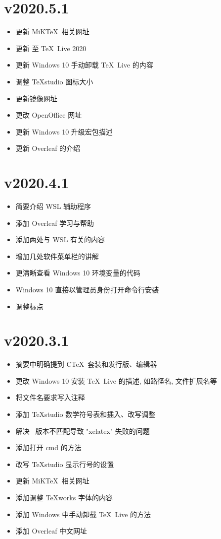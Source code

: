 \section*{v2020.5.1}

\begin{itemize}
  \item 更新 MiK\TeX\ 相关网址
  \item 更新 至 \TeX~Live 2020
  \item 更新 Windows 10 手动卸载 \TeX~Live 的内容
  \item 调整 \TeX studio 图标大小
  \item 更新镜像网址
  \item 更改 \textsf{OpenOffice} 网址
  \item 更新 Windows 10 升级宏包描述
  \item 更新 Overleaf 的介绍
\end{itemize}

\section*{v2020.4.1}

\begin{itemize}
  \item 简要介绍 WSL 辅助程序
  \item 添加 Overleaf 学习与帮助
  \item 添加两处与 WSL 有关的内容
  \item 增加几处软件菜单栏的讲解
  \item 更清晰查看 Windows 10 环境变量的代码
  \item Windows 10 直接以管理员身份打开命令行安装
  \item 调整标点
\end{itemize}

\section*{v2020.3.1}

\begin{itemize}
    \item 摘要中明确提到 C\TeX\ 套装和发行版、编辑器
    \item 更改 Windows 10 安装 \TeX~Live 的描述, 如路径名, 文件扩展名等
    \item 将文件名要求写入注释
    \item 添加 \TeX studio 数学符号表和插入、改写调整
    \item 解决 \LaTeXe\ 版本不匹配导致 "xelatex" 失败的问题
    \item 添加打开 \textsf{cmd} 的方法
    \item 改写 \TeX studio 显示行号的设置
    \item 更新 MiK\TeX\ 相关网址
    \item 添加调整 \TeX works 字体的内容
    \item 添加 Windows 中手动卸载 \TeX~Live 的方法
    \item 添加 Overleaf 中文网址
\end{itemize}

